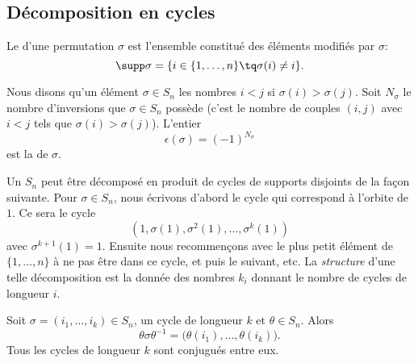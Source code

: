 \subsection{Décomposition en cycles}

\begin{definition}      \label{DEFooSupportPermutation}
    Le  d'une permutation $\sigma$ est l'ensemble constitué des éléments modifiés par $\sigma$:
    \begin{equation*}
        \supp \sigma = \{ i \in \{1,\ldots,n \} \tq \sigma(i) \neq i\}.
    \end{equation*}
\end{definition}

\begin{definition}  \label{DEFooWPYSooPWuwWO}
    Nous disons qu'un élément \( \sigma \in S_n\)  les nombres \( i<j\) si \( \sigma(i)>\sigma(j)\). Soit \( N_\sigma\) le nombre d'inversions que \( \sigma\in S_n\) possède (c'est le nombre de couples \( (i,j)\) avec \( i<j\) tels que \( \sigma(i)>\sigma(j)\)). L'entier
    \begin{equation}
        \epsilon(\sigma)=(-1)^{N_\sigma}
    \end{equation}
    est la  de \( \sigma\).
\end{definition}

Un  \( S_n\) peut être décomposé en produit de cycles de supports disjoints de la façon suivante. Pour \( \sigma \in S_n \), nous écrivons d'abord le cycle qui correspond à l'orbite de \( 1\). Ce sera le cycle
\begin{equation}
    (1,\sigma(1),\sigma^2(1),\ldots, \sigma^k(1))
\end{equation}
avec \( \sigma^{k+1}(1)=1\). Ensuite nous recommençons avec le plus petit élément de \( \{ 1,\ldots, n \}\) à ne pas être dans ce cycle, et puis le suivant, etc. La \emph{structure} d'une telle décomposition est la donnée des nombres \( k_i\) donnant le nombre de cycles de longueur \( i\).

\begin{lemma}        \label{LemmvZFWP}
    Soit \( \sigma=(i_1,\ldots, i_k)\in S_n\), un cycle de longueur \( k\) et \( \theta\in S_n\). Alors
    \begin{equation}
        \theta\sigma\theta^{-1}=\big( \theta(i_1),\ldots, \theta(i_k) \big).
    \end{equation}
    Tous les cycles de longueur \( k\) sont conjugués entre eux.
\end{lemma}

